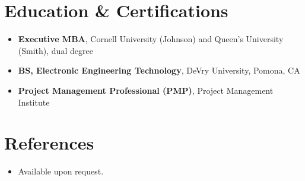\documentclass[11pt,letterpaper,sans]{moderncv}
\begin{document}
\section{Education \& Certifications}
\vspace{1pt}
\begin{itemize}
\item{\textbf{Executive MBA}, Cornell University (Johnson) and Queen's University (Smith), dual degree}
\item{\textbf{BS, Electronic Engineering Technology}, DeVry University, Pomona, CA}
\item{\textbf{Project Management Professional (PMP)}, Project Management Institute}
\end{itemize}


\section{References}
\vspace{1pt}
\begin{itemize}
\item{Available upon request.}
\end{itemize}
\end{document}
